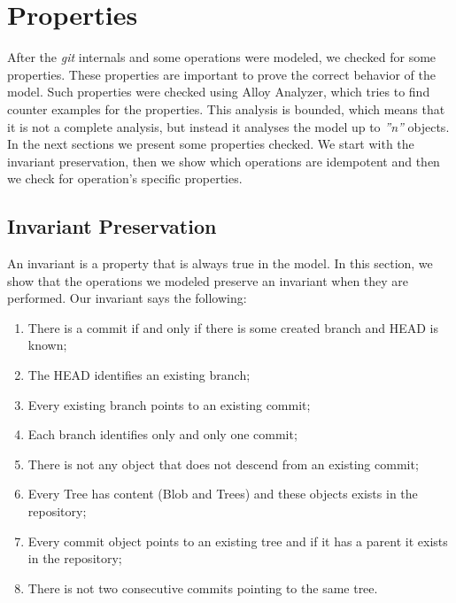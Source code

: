 \chapter{Properties}
After the \emph{git} internals and some operations were modeled,
we checked for some properties. These properties are important to
prove the correct behavior of the model. Such properties were checked using
Alloy Analyzer, which tries to find counter examples for the
properties. This analysis is bounded, which means that it is not a
complete analysis, but instead it analyses the model up to
\emph{''n''} objects.\\

In the next sections we present some properties checked. We start with
the invariant preservation, then we show which operations are
idempotent and then we check for operation's specific properties.

\section{Invariant Preservation}
An invariant is a property that is always true in the model. In this
section, we show that the operations we modeled preserve an invariant
when they are performed. Our invariant says the following:
\begin{enumerate}
   \item There is a commit if and only if there is some created branch
   and HEAD is known;
   \item The HEAD identifies an existing branch;
   \item Every existing branch points to an existing commit;
   \item Each branch identifies only and only one commit;
   \item There is not any object that does not descend from an existing
   commit;
   \item Every Tree has content (Blob and Trees) and these objects
   exists in the repository;
   \label{item:treeContainsSome}
   \item Every commit object points to an existing tree and if it has
   a parent it exists in the repository;
   \item There is not two consecutive commits pointing to the same tree.
\end{enumerate}

